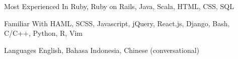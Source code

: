 


\begin{cvskills}


  \cvskill
  {Most Experienced In}
  {Ruby, Ruby on Rails, Java, Scala, HTML, CSS, SQL}


  \cvskill
  {Familiar With}
  {HAML, SCSS, Javascript, jQuery, React.js, Django, Bash, C/C++, Python, R, Vim}


  \cvskill
  {Languages}
  {English, Bahasa Indonesia, Chinese (conversational)}


\end{cvskills}
